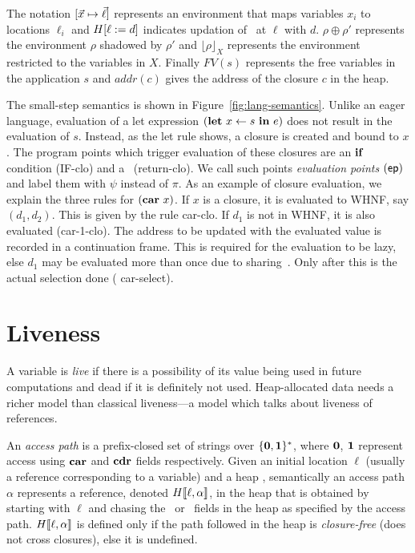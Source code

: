 \documentclass[9pt,preprint,nonatbib]{sigplanconf}
\def\myvec{\mathaccent"017E }
\begin{document}
The   notation  $[\myvec{x}   \mapsto  \myvec{\ell}]$   represents  an
environment  that  maps  variables  $x_i$ to  locations  $\ell_i$  and
$H[\ell := d]$  indicates updation of  \heap\ at $\ell$
with  $d$.   $\rho \oplus  \rho'$  represents  the environment  $\rho$
shadowed  by  $\rho'$  and  $\lfloor \rho  \rfloor_X$  represents  the
environment  restricted  to  the  variables in  $X$.  Finally  $FV(s)$
represents the  free variables  in the  application $s$  and $addr(c)$
gives the address of the closure $c$ in the heap.

The small-step semantics  is shown in Figure~\ref{fig:lang-semantics}.
Unlike   an   eager  language,   evaluation   of   a  let   expression
$(\mbox{$\mathbf{ let}$}~x\leftarrow  s~\mbox{$\mathbf{ in}$}~e)$ does  not  result in  the evaluation  of
$s$. Instead,  as the {\sc let}  rule shows, a closure  is created and
bound to  $x$. The  program points which  trigger evaluation  of these
closures   are  an $\mbox{$\mathbf{ if}$}$   condition ({\sc  IF-clo})   and
 a \SRETURN\ ({\sc  return-clo}).  We  call such  points \emph{evaluation
  points   $(\mathsf{ep})$}  and   label  them   with  $\psi$   instead  of
$\pi$. As an  example of closure  evaluation, we  explain the
three rules for  $(\mbox{$\mathbf{car}$}~x)$.  If $x$ is a closure,  it is evaluated to
WHNF, say $(d_1, d_2)$.  This is  given by the rule {\sc car-clo}.  If
$d_1$ is  not in WHNF,  it is  also evaluated ({\sc  car-1-clo}).  The
address  to be  updated  with the  evaluated value  is
recorded  in  a  continuation  frame.    This  is  required  for the
evaluation  to be lazy, else $d_1$ may  be evaluated more than once
due to  sharing~\cite{Jones87}.  Only after this  is the actual selection  done ({\sc
  car-select}).


\section{Liveness}
\label{sec:liveness}


A variable is {\em live} if there  is a possibility of its value being
used in  future computations and  dead if  it is definitely  not used.
Heap-allocated data  needs a richer model  than classical liveness---a
model which talks about liveness of references.  



An {\em access path}
is a  prefix-closed set of strings  over $\{\mathbf{0},\mathbf{1}\}^\ast$, where
$\mathbf{0}$,  $\mathbf{1}$ represent  access  using $\mbox{$\mathbf{car}$}$  and $\mbox{$\mathbf{cdr}$}$  fields respectively.
Given an initial location $\ell$ (usually a reference corresponding to
a variable)  and a  heap \heap, semantically  an access  path $\alpha$
represents     a      reference,     denoted     $H\llbracket\ell,
\alpha\rrbracket$,  in the  heap  that is  obtained  by starting  with
$\ell$ and chasing the \CAR\ or  \CDR\ fields in the heap as specified
by  the  access   path.   $H\llbracket\ell,  \alpha\rrbracket$  is
defined only if  the path followed in the  heap is \emph{closure-free}
(does not cross closures), else it is undefined.
\end{document}
